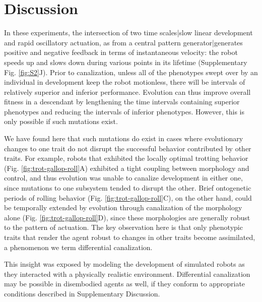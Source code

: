 \section*{Discussion}
\label{sec4:discussion}

 
In these experiments, the intersection of two time scales|slow linear development and rapid oscillatory actuation, as from a central pattern generator|generates positive and negative feedback in terms of instantaneous velocity: the robot speeds up and slows down during various points in its lifetime (Supplementary Fig. \ref{fig:S2}J).%
Prior to canalization, unless all of the phenotypes swept over by an individual in development keep the robot motionless, there will be intervals of relatively superior and inferior performance.
Evolution can thus improve overall fitness in a descendant by lengthening the time intervals containing superior phenotypes and reducing the intervals of inferior phenotypes. However, this is only possible if such mutations exist.

We have found here that such mutations do exist in cases where evolutionary changes
to one trait do not disrupt the successful behavior contributed
by other traits.
For example,
robots that exhibited the locally optimal trotting behavior 
(Fig. \ref{fig:trot-gallop-roll}A)
exhibited a tight coupling between morphology and control, and thus evolution was 
unable to canalize development in either one, since mutations to one subsystem 
tended to disrupt the other.
Brief ontogenetic periods of rolling behavior 
(Fig. \ref{fig:trot-gallop-roll}C), 
on the other hand, could be temporally extended by evolution through canalization of the morphology alone
(Fig. \ref{fig:trot-gallop-roll}D), 
since these morphologies are generally robust to the pattern of actuation.
The key observation here is that only phenotypic traits that render the agent robust to changes in other traits become assimilated, a phenomenon we term differential canalization. 

This insight was exposed by modeling the development of simulated robots as they interacted with a physically realistic environment.
Differential canalization may be possible in disembodied agents as well, 
if they conform to appropriate conditions described in Supplementary Discussion.

